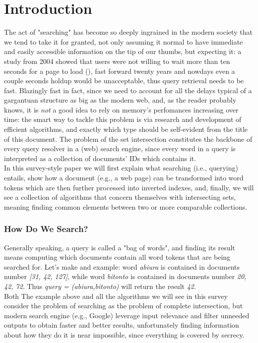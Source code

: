 \chapter{Introduction\label{intro}}

The act of "searching" has become so deeply ingrained in the modern society that we tend to take it for granted, not only assuming it normal to have immediate and easily accessible information on the tip of our thumbs, but expecting it: a study from 2004 showed that users were not willing to wait more than ten seconds for a page to load (\cite{waitTime}), fast forward twenty years and nowdays even a couple seconds holdup would be unacceptable, thus query retrieval needs to be fast. Blazingly fast in fact, since we need to account for all the delays typical of a gargantuan structure as big as the modern web, and, as the reader probably knows, it is \textit{not} a good idea to rely on memory's perfomances increasing over time: the smart way to tackle this problem is via research and development of efficient algorithms, and exactly which type should be self-evident from the title of this document. The problem of the set intersection constitutes the backbone of every query resolver in a (web) search engine, since every word in a query is interpreted as a collection of documents' IDs which contains it. \\
In this survey-style paper we will first explain what searching (i.e., querying) entails, show how a document (e.g., a web page) can be transformed into word tokens which are then further processed into inverted indexes, and, finally, we will see a collection of algorithms that concern themselves with intersecting sets, meaning finding common elements between two or more comparable collections. 

\subsection{How Do We Search?}

Generally speaking, a query is called a "bag of words", and finding its result means computing which documents contain all word tokens that are being searched for. Let's make and example: word \textit{abiura} is contained in documents number \textit{[31, 42, 127]}, while word \textit{bitonto} is contained in documents number \textit{20, 42, 72}. Thus \textit{query = (abiura,bitonto)} will return the result \textit{42}. \\
Both The example above and all the algorithms we will see in this survey consider the problem of searching as the problem of complete intersection, but modern search engine (e.g., Google)  leverage input relevance and filter unneeded outputs to obtain faster and better results, unfortunately finding information about how they do it is near impossible, since everything is covered by secrecy.